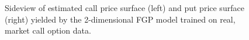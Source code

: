 \documentclass[a4paper,12pt]{article}
\begin{document}
\begin{figure}[H]
\begin{minipage}[c]{.45\linewidth}
    \centering
\end{minipage} \hfill
\begin{minipage}[c]{.45\linewidth}
    \centering
\end{minipage}
\caption{Sideview of estimated call price surface (left) and put price surface (right) yielded by the 2-dimensional FGP model trained on real, market call option data.}
\label{fig:real_data_sideview}
\end{figure}

\newpage
\end{document}
